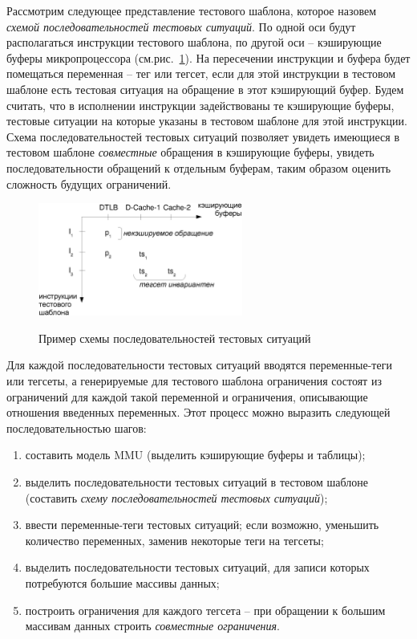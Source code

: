 Рассмотрим следующее представление тестового шаблона, которое
назовем \emph{схемой последовательностей тестовых ситуаций}. По
одной оси будут располагаться инструкции тестового шаблона, по
другой оси -- кэширующие буферы микропроцессора
(см.рис.~\ref{template_scheme}). На пересечении инструкции и буфера
будет помещаться переменная -- тег или тегсет, если для этой
инструкции в тестовом шаблоне есть тестовая ситуация на обращение в
этот кэширующий буфер. Будем считать, что в исполнении инструкции
задействованы те кэширующие буферы, тестовые ситуации на которые
указаны в тестовом шаблоне для этой инструкции. Схема
последовательностей тестовых ситуаций позволяет увидеть имеющиеся в
тестовом шаблоне \emph{совместные} обращения в кэширующие буферы,
увидеть последовательности обращений к отдельным буферам, таким
образом оценить сложность будущих ограничений.

\begin{figure}[h] \center
  \includegraphics[width=0.6\textwidth]{2.theor/template_scheme}\\
  \caption{Пример схемы последовательностей тестовых ситуаций}\label{template_scheme}
\end{figure}

Для каждой последовательности тестовых ситуаций вводятся
переменные-теги или тегсеты, а генерируемые для тестового шаблона
ограничения состоят из ограничений для каждой такой переменной и
ограничения, описывающие отношения введенных переменных. Этот
процесс можно выразить следующей последовательностью шагов:
\begin{enumerate}
  \item составить модель MMU (выделить кэширующие буферы и
  таблицы);
  \item выделить последовательности тестовых ситуаций в тестовом
  шаблоне (составить \emph{схему последовательностей тестовых
  ситуаций});
  \item ввести переменные-теги тестовых ситуаций; если
  возможно, уменьшить количество переменных, заменив некоторые теги
  на тегсеты;
  \item выделить последовательности тестовых ситуаций, для записи
  которых потребуются большие массивы данных;
  \item построить ограничения для каждого тегсета -- при обращении к
  большим массивам данных строить \emph{совместные ограничения}.
\end{enumerate}

